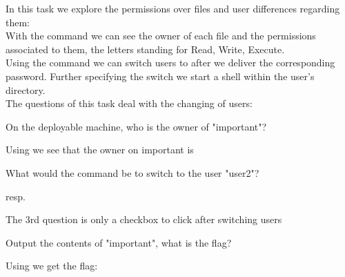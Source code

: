 \begin{task}[Permissions 101]
In this task we explore the permissions over files and user differences regarding them:\\
With the command  we can see the owner of each file and the permissions associated to them, the letters  standing for Read, Write, Execute.\\
Using the command  we can switch users to  after we deliver the corresponding password. Further specifying the switch  we start a shell within the user's directory.\\
The questions of this task deal with the changing of users:
\begin{Q}
On the deployable machine, who is the owner of "important"?
\end{Q}
\begin{A}
Using  we see that the owner on important is 
\end{A}
\begin{Q}
What would the command be to switch to the user "user2"?
\end{Q}
\begin{A}
 resp. 
\end{A}
The 3rd question is only a checkbox to click after switching users\\
\begin{Q}
Output the contents of "important", what is the flag?
\end{Q}
\begin{A}
Using  we get the flag: 
\end{A}
\end{task}

